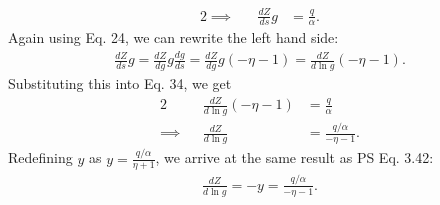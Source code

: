 \documentclass[11pt,letterpaper]{article}
\begin{document}
\begin{enumerate}[label=(\roman*)]
\begin{alignat}{2}
        \implies&&\frac{dZ}{ds}g &= \frac{q}{\alpha}.
    \end{alignat}
    Again using Eq. 24, we can rewrite the left hand side:
    \begin{align}
        \frac{dZ}{ds}g = \frac{dZ}{dg}g\frac{dg}{ds} = \frac{dZ}{dg}g(-\eta-1) = \frac{dZ}{d\ln{g}}(-\eta-1).
    \end{align}
    Substituting this into Eq. 34, we get 
    \begin{alignat}{2}
        &&\frac{dZ}{d\ln{g}}(-\eta-1) &= \frac{q}{\alpha} \\
        \implies&&\frac{dZ}{d\ln{g}} &= \frac{q/\alpha}{-\eta-1}.
    \end{alignat}
    Redefining $y$ as $y = \frac{q/\alpha}{\eta+1}$, we arrive at the same result as PS Eq. 3.42:
    \begin{align}
        \frac{dZ}{d\ln{g}} = -y = \frac{q/\alpha}{-\eta-1}.
    \end{align}


\end{enumerate}
\end{document}
